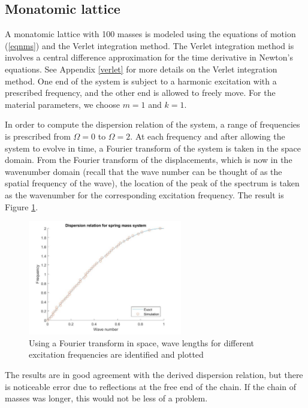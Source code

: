 \documentclass{article}
\begin{document}
\subsection{Monatomic lattice}
A monatomic lattice with 100 masses is modeled using the equations of motion 
(\ref{eqnms}) and the Verlet integration method. The Verlet integration method 
is involves a central difference approximation for the time derivative in 
Newton's equations. See Appendix \ref{verlet} for more details on the Verlet 
integration method. One end of the system is subject to a harmonic excitation 
with a prescribed frequency, and the other end is allowed to freely move. For 
the material parameters, we choose $m=1$ and $k=1$.

In order to compute the dispersion relation of the system, a range of 
frequencies is prescribed from $\Omega=0$ to $\Omega=2$. At each frequency and 
after allowing the system to evolve in time, a Fourier transform of the system 
is taken in the space domain. From the Fourier transform of the displacements, 
which is now in the wavenumber domain (recall that the wave number can be 
thought of as the spatial frequency of the wave), the location of the peak of 
the spectrum is taken as the wavenumber for the corresponding excitation 
frequency. The result is Figure \ref{fig:matlab-dr}.
\begin{figure}[!htbp]
	\centering
	\includegraphics[width=0.6\textwidth]{matlab-dr.pdf}
	\caption{Using a Fourier transform in space, wave lengths for different 
	excitation frequencies are identified and plotted}
	\label{fig:matlab-dr}
\end{figure}
The results are in good agreement with the derived dispersion relation, but 
there is noticeable error due to reflections at the free end of the chain. If 
the chain of masses was longer, this would not be less of a problem. 
\end{document}
